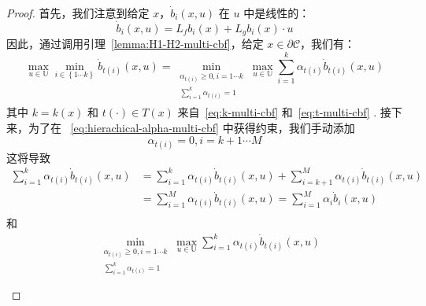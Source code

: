 \begin{proof}
首先，我们注意到给定 $x$，$\dot{b}_i(x, u)$ 在 $u$ 中是线性的：
\begin{equation}
\dot{b}_i\left( x,u \right) =L_fb_i\left( x \right) +L_gb_i\left( x \right) \cdot u
\end{equation}
因此，通过调用引理~\ref{lemma:H1-H2-multi-cbf}，给定 $x \in \partial \mathcal{C}$，我们有：
\begin{equation} \label{eq:main-thm-1-multi-cbf}
\max _{u\in \mathbb{U}}\min _{i\in \left\{ 1\cdots k \right\}}\dot{b}_{t\left( i \right)}\left( x,u \right) =\min _{\begin{array}{c}
	\alpha _{t\left( i \right)}\ge 0,i=1\cdots k\\
	\sum_{i=1}^k{\alpha _{t\left( i \right)}}=1\\
\end{array}}\max _{u\in \mathbb{U}}\sum_{i=1}^k{\alpha _{t\left( i \right)}}\dot{b}_{t\left( i \right)}\left( x,u \right)
\end{equation}
其中 $k=k(x)$ 和 $t(\cdot) \in T(x)$ 来自~\eqref{eq:k-multi-cbf} 和~\eqref{eq:t-multi-cbf} . 接下来，为了在 ~\eqref{eq:hierachical-alpha-multi-cbf} 中获得约束，我们手动添加
\begin{equation}
\alpha _{t\left( i \right)}=0,i=k+1\cdots M
\end{equation}
这将导致
\begin{equation}
\begin{aligned}
	\sum_{i=1}^k{\alpha _{t\left( i \right)}}\dot{b}_{t\left( i \right)}\left( x,u \right) &=\sum_{i=1}^k{\alpha _{t\left( i \right)}}\dot{b}_{t\left( i \right)}\left( x,u \right) +\sum_{i=k+1}^M{\alpha _{t\left( i \right)}}\dot{b}_{t\left( i \right)}\left( x,u \right)\\
	&=\sum_{i=1}^M{\alpha _{t\left( i \right)}}\dot{b}_{t\left( i \right)}\left( x,u \right) =\sum_{i=1}^M{\alpha _i}\dot{b}_i\left( x,u \right)\\
\end{aligned}
\end{equation}
和
\begin{eqnarray} \label{eq:main-thm-2-multi-cbf}
& \min_{\begin{array}{c}
	 \alpha_{t\left( i \right)}\ge 0,i=1\cdots k\\
	\sum_{i=1}^k{\alpha_{t\left( i \right)}}=1\\
\end{array}}\max _{u\in \mathbb{U}}\sum_{i=1}^k{\alpha _{t\left( i \right)}}\dot{b}_{t\left( i \right)}\left( x,u \right) \\

\end{eqnarray}
\end{proof}
